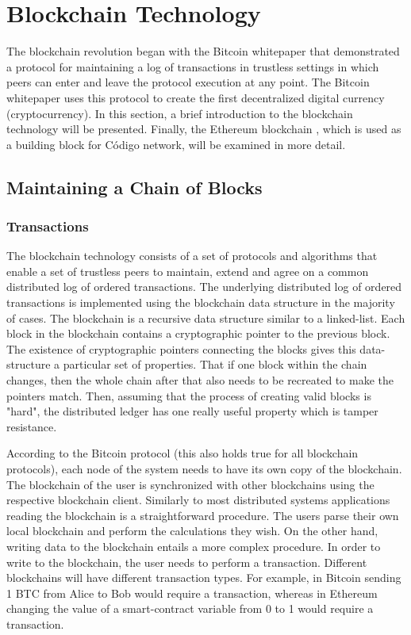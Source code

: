 
\chapter{Blockchain Technology} \label{chap:bc}{

The blockchain revolution began with the Bitcoin whitepaper \cite{nakamoto2008bitcoin} that demonstrated a protocol for maintaining a log of transactions in trustless settings in which peers can enter and leave the protocol execution at any point. The Bitcoin whitepaper uses this protocol to create the first decentralized digital currency (cryptocurrency). In this section, a brief introduction to the blockchain technology will be presented. Finally, the Ethereum blockchain \cite{WoodGavin2014Ethereum:Ledger}, which is used as a building block for Código network, will be examined in more detail.

\section{Maintaining a Chain of Blocks}{

\subsection{Transactions}{
The blockchain technology consists of a set of protocols and algorithms that enable a set of trustless peers to maintain, extend and agree on a common distributed log of ordered transactions. The underlying distributed log of ordered transactions is implemented using the blockchain data structure in the majority of cases. The blockchain is a recursive data structure similar to a linked-list. Each block in the blockchain contains a cryptographic pointer to the previous block. The existence of cryptographic pointers connecting the blocks gives this data-structure a particular set of properties. That if one block within the chain changes, then the whole chain after that also needs to be recreated to make the pointers match. Then, assuming that the process of creating valid blocks is "hard", the distributed ledger has one really useful property which is tamper resistance.

According to the Bitcoin protocol (this also holds true for all blockchain protocols), each node of the system needs to have its own copy of the blockchain. The blockchain of the user is synchronized with other blockchains using the respective blockchain client. Similarly to most distributed systems applications reading the blockchain is a straightforward procedure. The users parse their own local blockchain and perform the calculations they wish. On the other hand, writing data to the blockchain entails a more complex procedure. In order to write to the blockchain, the user needs to perform a transaction. Different blockchains will have different transaction types. For example, in Bitcoin sending 1 BTC from Alice to Bob would require a transaction, whereas in Ethereum changing the value of a smart-contract variable from 0 to 1 would require a transaction.

}}}
